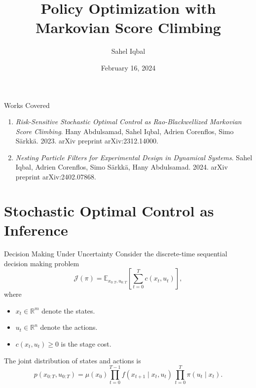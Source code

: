\documentclass[10pt, aspectratio=1610]{beamer}
\title{Policy Optimization with Markovian Score Climbing}
\date{February 16, 2024}
\author{Sahel Iqbal}
\institute{Aalto University, Finland}
\begin{document}
  \maketitle

  
  \begin{frame}{Works Covered}
    \begin{enumerate}
      \item \emph{Risk-Sensitive Stochastic Optimal Control as Rao-Blackwellized Markovian Score Climbing}. Hany Abdulsamad, Sahel Iqbal, Adrien Corenflos, Simo S\"arkk\"a. 2023. arXiv preprint arXiv:2312.14000.
      \item \emph{Nesting Particle Filters for Experimental Design in Dynamical Systems}. Sahel Iqbal, Adrien Corenflos, Simo S\"arkk\"a, Hany Abdulsamad. 2024. arXiv preprint arXiv:2402.07868.
    \end{enumerate}
  \end{frame}

  \section{Stochastic Optimal Control as Inference}
    \begin{frame}{Decision Making Under Uncertainty}
      Consider the discrete-time sequential decision making problem
      \begin{equation}\label{eq:soc_objective}
        \mathcal{J}(\pi) = \mathbb{E}_{x_{0:T}, u_{0:T}} \left[\sum_{t=0}^{T} c(x_t, u_t)\right],
      \end{equation}
      where
      \begin{itemize}
        \item $x_t \in \mathbb{R}^m$ denote the states.
        \item $u_t \in \mathbb{R}^n$ denote the actions.
        \item $c(x_t, u_t) \geq 0$ is the stage cost.
      \end{itemize}
  
      \vskip 1cm
      The joint distribution of states and actions is
      \begin{equation}
          p(x_{0:T}, u_{0:T}) = \mu(x_{0}) \prod_{t=0}^{T-1} f(x_{t+1} \mid x_t, u_t) \, \prod_{t=0}^T \pi(u_t \mid x_t).
      \end{equation}
    \end{frame}
\end{document}
